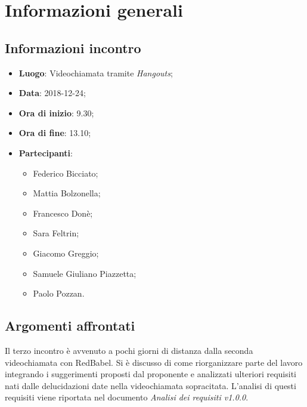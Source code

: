 \section{Informazioni generali}

\subsection{Informazioni incontro}
\begin{itemize}
\item \textbf{Luogo}: Videochiamata tramite \textit{Hangouts};
\item \textbf{Data}: 2018-12-24;
\item \textbf{Ora di inizio}: 9.30;
\item \textbf{Ora di fine}: 13.10;
\item \textbf{Partecipanti}:
\begin{itemize}
	\item Federico Bicciato;
	\item Mattia Bolzonella;
	\item Francesco Donè;
	\item Sara Feltrin;
	\item Giacomo Greggio;
	\item Samuele Giuliano Piazzetta;
	\item Paolo Pozzan.
\end{itemize}
\end{itemize}

\subsection{Argomenti affrontati}
Il terzo incontro è avvenuto a pochi giorni di distanza dalla seconda videochiamata
con RedBabel. Si è discusso di come riorganizzare parte del lavoro integrando 
i suggerimenti proposti dal proponente e analizzati ulteriori requisiti nati dalle
delucidazioni date nella videochiamata sopracitata. L'analisi di questi requisiti 
viene riportata nel documento \textit{Analisi dei requisiti v1.0.0}.
